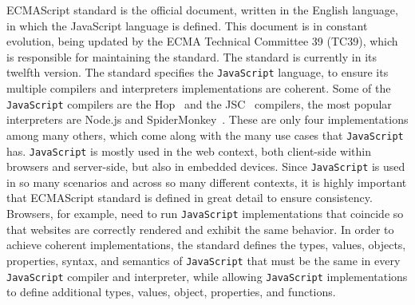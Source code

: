 \documentclass[runningheads]{llncs}
\begin{document}
ECMAScript standard is the official document, written in the English language, in which the JavaScript language is defined. This document is in constant evolution, being updated by the ECMA Technical Committee 39 (TC39), which is responsible for maintaining the standard. The standard is currently in its twelfth version. 
%
The standard specifies the \texttt{JavaScript} language, to ensure its multiple compilers and interpreters implementations are coherent. Some of the \texttt{JavaScript} compilers are the Hop~\cite{Hop} and the JSC~\cite{JSC} compilers, the most popular interpreters are Node.js and SpiderMonkey~\cite{SpiderMonkey}. These are only four implementations among many others, which come along with the many use cases that \texttt{JavaScript} has.
%
\texttt{JavaScript} is mostly used in the web context, both client-side within browsers and server-side, but also in embedded devices. Since \texttt{JavaScript} is used in so many scenarios and across so many different contexts, it is highly important that ECMAScript standard is defined in great detail to ensure consistency. Browsers, for example, need to run \texttt{JavaScript} implementations that coincide so that websites are correctly rendered and exhibit the same behavior. In order to achieve coherent implementations, the standard defines the types, values, objects, properties, syntax, and semantics of \texttt{JavaScript} that must be the same in every \texttt{JavaScript} compiler and interpreter, while allowing \texttt{JavaScript} implementations to define additional types, values, object, properties, and functions.
\end{document}
